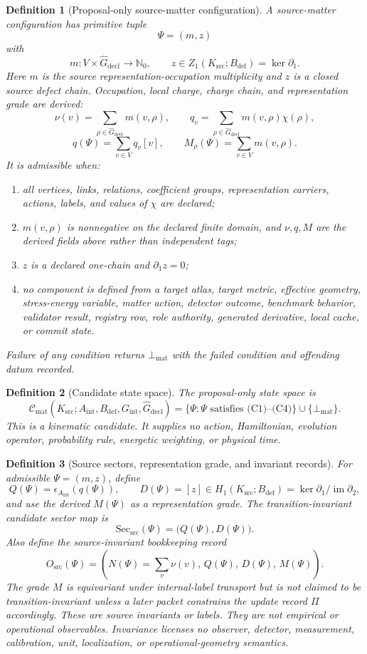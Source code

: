 \documentclass[11pt]{article}
\newtheorem{definition}{Definition}
\newcommand{\Ksrc}{K_{\mathrm{src}}}
\newcommand{\Aint}{A_{\mathrm{int}}}
\newcommand{\Bdef}{B_{\mathrm{def}}}
\newcommand{\Gint}{G_{\mathrm{int}}}
\newcommand{\Rdecl}{\widehat G_{\mathrm{decl}}}
\newcommand{\Conf}{\mathcal C_{\mathrm{mat}}}
\newcommand{\Sect}{\mathrm{Sec}_{\mathrm{src}}}
\newcommand{\Malformed}{\bot_{\mathrm{mat}}}
\begin{document}
\begin{definition}[Proposal-only source-matter configuration]
A source-matter configuration has primitive tuple
\[
  \Psi=(m,z)
\]
with
\[
  m:V\times\Rdecl\longrightarrow\mathbb N_0,
  \qquad
  z\in Z_1(\Ksrc;\Bdef)=\ker\partial_1 .
\]
Here \(m\) is the source representation-occupation multiplicity and \(z\) is
a closed source defect chain. Occupation, local charge, charge chain, and
representation grade are derived:
\[
  \nu(v)=\sum_{\rho\in\Rdecl}m(v,\rho),\qquad
  q_v=\sum_{\rho\in\Rdecl}m(v,\rho)\chi(\rho),
\]
\[
  q(\Psi)=\sum_{v\in V}q_v[v],
  \qquad
  M_\rho(\Psi)=\sum_{v\in V}m(v,\rho).
\]
It is admissible when:
\begin{enumerate}[label=\textup{(C\arabic*)},leftmargin=*]
\item all vertices, links, relations, coefficient groups, representation
  carriers, actions, labels, and values of \(\chi\) are declared;
\item \(m(v,\rho)\) is nonnegative on the declared finite domain, and
  \(\nu,q,M\) are the derived fields above rather than independent tags;
\item \(z\) is a declared one-chain and \(\partial_1z=0\);
\item no component is defined from a target atlas, target metric, effective
  geometry, stress-energy variable, matter action, detector outcome,
  benchmark behavior, validator result, registry row, role authority,
  generated derivative, local cache, or commit state.
\end{enumerate}
Failure of any condition returns \(\Malformed\) with the failed condition and
offending datum recorded.
\end{definition}

\begin{definition}[Candidate state space]
The proposal-only state space is
\[
  \Conf(\Ksrc;\Aint,\Bdef,\Gint,\Rdecl)
  =
  \{\Psi:\Psi\text{ satisfies (C1)--(C4)}\}
  \cup\{\Malformed\}.
\]
This is a kinematic candidate. It supplies no action, Hamiltonian, evolution
operator, probability rule, energetic weighting, or physical time.
\end{definition}

\begin{definition}[Source sectors, representation grade, and invariant records]
For admissible \(\Psi=(m,z)\), define
\[
  Q(\Psi)=\epsilon_{\Aint}(q(\Psi)),\qquad
  D(\Psi)=[z]\in
  H_1(\Ksrc;\Bdef)=
  \ker\partial_1/\operatorname{im}\partial_2,
\]
and use the derived \(M(\Psi)\) as a representation grade. The
transition-invariant candidate sector map is
\[
  \Sect(\Psi)=\bigl(Q(\Psi),D(\Psi)\bigr).
\]
Also define the source-invariant bookkeeping record
\[
  O_{\mathrm{src}}(\Psi)
  =
  \left(
    N(\Psi)=\sum_v\nu(v),\,
    Q(\Psi),\,
    D(\Psi),\,
    M(\Psi)
  \right).
\]
The grade \(M\) is equivariant under internal-label transport but is not
claimed to be transition-invariant unless a later packet constrains the
update record \(\Pi\) accordingly.
These are source invariants or labels. They are not empirical or operational
observables. Invariance licenses no observer, detector, measurement,
calibration, unit, localization, or operational-geometry semantics.
\end{definition}
\end{document}
